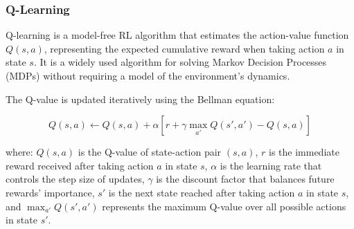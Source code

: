 \subsubsection{Q-Learning}\label{subsubsec:q-learning}

Q-learning is a model-free RL algorithm that estimates the action-value function \(Q(s, a)\), representing the expected cumulative reward when taking action \(a\) in state \(s\). It is a widely used algorithm for solving Markov Decision Processes (MDPs) without requiring a model of the environment's dynamics.

The Q-value is updated iteratively using the Bellman equation:

\[Q(s, a) \leftarrow Q(s, a) + \alpha \left[ r + \gamma \max_{a'} Q(s', a') - Q(s, a) \right]\]

where:
\(Q(s, a)\) is the Q-value of state-action pair \((s, a)\),
\(r\) is the immediate reward received after taking action \(a\) in state \(s\),
\(\alpha\) is the learning rate that controls the step size of updates,
\(\gamma\) is the discount factor that balances future rewards' importance,
\(s'\) is the next state reached after taking action \(a\) in state \(s\), and
\(\max_{a'} Q(s', a')\) represents the maximum Q-value over all possible actions in state \(s'\).

